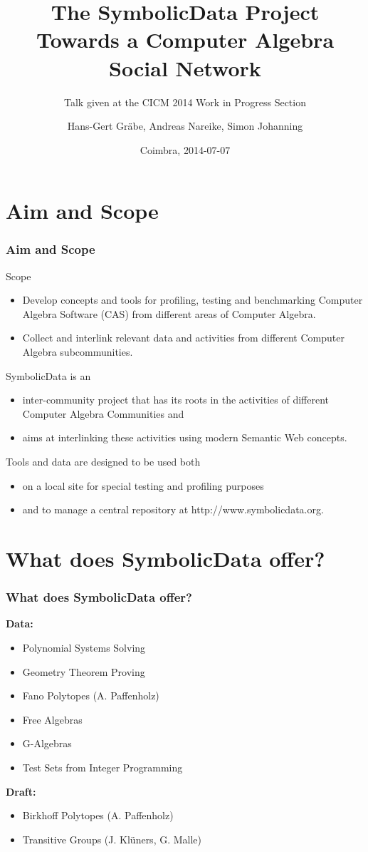\documentclass{beamer}
\title[The SymbolicData Project]{The SymbolicData Project\\ Towards a
  Computer Algebra Social Network}
\subtitle{Talk given at the CICM 2014 Work in Progress Section}
\author[Gr\"abe, Nareike, Johanning]{Hans-Gert Gr\"abe, Andreas Nareike, Simon
  Johanning}
\institute[]{Leipzig University, Germany\\
\texttt{http://bis.informatik.uni-leipzig.de/HansGertGraebe}}
\date{Coimbra, 2014-07-07}
\begin{document}
\begin{frame}
\titlepage
\end{frame}

\section{Aim and Scope}
\begin{frame}\frametitle{Aim and Scope}\small
{\normalsize Scope}
\begin{itemize}
\item Develop concepts and tools for profiling, testing and benchmarking
  Computer Algebra Software (CAS) from different areas of Computer Algebra.
\item Collect and interlink relevant data and activities from different
  Computer Algebra subcommunities.
\end{itemize}
{\normalsize SymbolicData is an}
\begin{itemize}
\item inter-community project that has its roots in the activities of
  different Computer Algebra Communities and
\item aims at interlinking these activities using modern Semantic Web
  concepts. 
\end{itemize}
{\normalsize Tools and data are designed to be used both}
\begin{itemize}
\item on a local site for special testing and profiling purposes
\item and to manage a central repository at http://www.symbolicdata.org.
\end{itemize}
\end{frame}

\section{What does SymbolicData offer?}
\begin{frame}\frametitle{What does SymbolicData offer?}
\textbf{Data:}
\begin{itemize}
\item Polynomial Systems Solving
\item Geometry Theorem Proving
\item Fano Polytopes (A. Paffenholz)
\item Free Algebras
\item G-Algebras
\item Test Sets from Integer Programming
\end{itemize}
\textbf{Draft:}
\begin{itemize}
\item Birkhoff Polytopes (A. Paffenholz)
\item Transitive Groups (J. Kl\"uners, G. Malle)
\end{itemize}
\end{frame}
\end{document}
